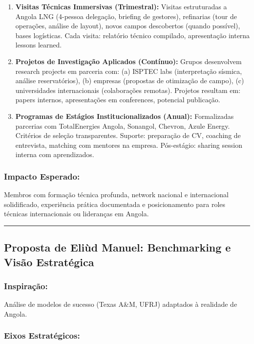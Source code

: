 \documentclass[12pt,a4paper]{article}
\begin{document}
\begin{enumerate}[itemsep=0.25cm]
    \item \textbf{Visitas Técnicas Immersivas (Trimestral):} Visitas estruturadas a Angola LNG (4-pessoa delegação, briefing de gestores), refinarias (tour de operações, análise de layout), novos campos descobertos (quando possível), bases logísticas. Cada visita: relatório técnico compilado, apresentação interna lessons learned.
    
    \item \textbf{Projetos de Investigação Aplicados (Contínuo):} Grupos desenvolvem research projects em parceria com: (a) ISPTEC labs (interpretação sísmica, análise reservatórios), (b) empresas (propostas de otimização de campo), (c) universidades internacionais (colaborações remotas). Projetos resultam em: papers internos, apresentações em conferences, potencial publicação.
    
    \item \textbf{Programas de Estágios Institucionalizados (Anual):} Formalizadas parcerias com TotalEnergies Angola, Sonangol, Chevron, Azule Energy. Critérios de seleção transparentes. Suporte: preparação de CV, coaching de entrevista, matching com mentores na empresa. Pós-estágio: sharing session interna com aprendizados.
\end{enumerate}

\subsubsection*{Impacto Esperado:}
Membros com formação técnica profunda, network nacional e internacional solidificado, experiência prática documentada e posicionamento para roles técnicas internacionais ou lideranças em Angola.

\textcolor{spe-secondary}{\hspace{0.5cm}\rule{0.4\linewidth}{0.8pt}}
\subsection{Proposta de Eliùd Manuel: Benchmarking e Visão Estratégica}

\subsubsection*{Inspiração:}
Análise de modelos de sucesso (Texas A\&M, UFRJ) adaptados à realidade de Angola.

\subsubsection*{Eixos Estratégicos:}
\end{document}
